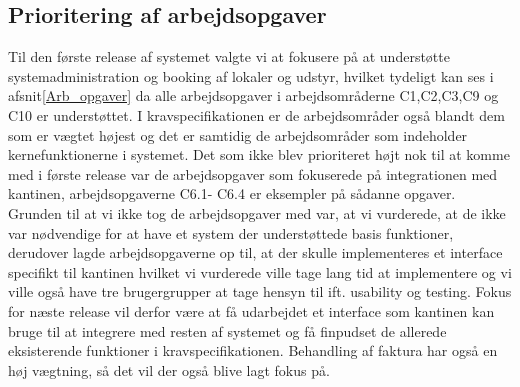 \subsection{Prioritering af arbejdsopgaver}
\label{Baggrund_Arb_opgaver_Prio_Arb_Opg}
Til den første release af systemet valgte vi at fokusere på at understøtte systemadministration og booking af lokaler og udstyr, hvilket tydeligt kan ses i afsnit\ref{Arb_opgaver} da alle arbejdsopgaver i arbejdsområderne C1,C2,C3,C9 og C10 er understøttet. I kravspecifikationen er de arbejdsområder også blandt dem som er vægtet højest og det er samtidig de arbejdsområder som indeholder kernefunktionerne i systemet. Det som ikke blev prioriteret højt nok til at komme med i første release var de arbejdsopgaver som fokuserede på integrationen med kantinen, arbejdsopgaverne C6.1- C6.4 er eksempler på sådanne opgaver.
\\Grunden til at vi ikke tog de arbejdsopgaver med var, at vi vurderede, at de ikke var nødvendige for at have et system der understøttede basis funktioner, derudover lagde arbejdsopgaverne op til, at der skulle implementeres et interface specifikt til kantinen hvilket vi vurderede ville tage lang tid at implementere og vi ville også have tre brugergrupper at tage hensyn til ift. usability og testing.
Fokus for næste release vil derfor være at få udarbejdet et interface som kantinen kan bruge til at integrere med resten af systemet og få finpudset de allerede eksisterende funktioner i kravspecifikationen. Behandling af faktura har også en høj vægtning, så det vil der også blive lagt fokus på. 
